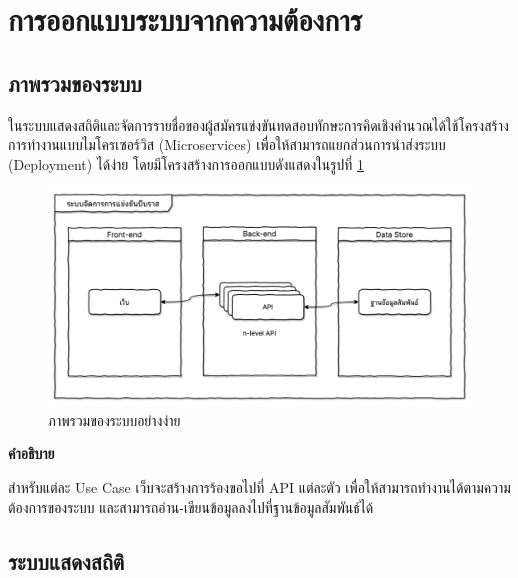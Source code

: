 \newpage

\section{การออกแบบระบบจากความต้องการ}
\subsection{ภาพรวมของระบบ}

ในระบบแสดงสถิติและจัดการรายชื่อของผู้สมัครแข่งขันทดสอบทักษะการคิดเชิงคำนวณได้ใช้โครงสร้างการทำงานแบบไมโครเซอร์วิส (Microservices) \cite{WhatAreMicroservices} เพื่อให้สามารถแยกส่วนการนำส่งระบบ (Deployment) ได้ง่าย โดยมีโครงสร้างการออกแบบดังแสดงในรูปที่ \ref{fig:simplified-system-overview-diagram}

\begin{figure}[H]
    \centering
    \includegraphics[width=125mm,scale=1.0]{diagrams/simplified-system-overview-diagram.png}
    \caption{ภาพรวมของระบบอย่างง่าย}
    \label{fig:simplified-system-overview-diagram}
\end{figure}

\textbf{คำอธิบาย}

สำหรับแต่ละ Use Case เว็บจะสร้างการร้องขอไปที่ API แต่ละตัว เพื่อให้สามารถทำงานได้ตามความต้องการของระบบ และสามารถอ่าน-เขียนข้อมูลลงไปที่ฐานข้อมูลสัมพันธ์ได้

\subsection{ระบบแสดงสถิติ}

